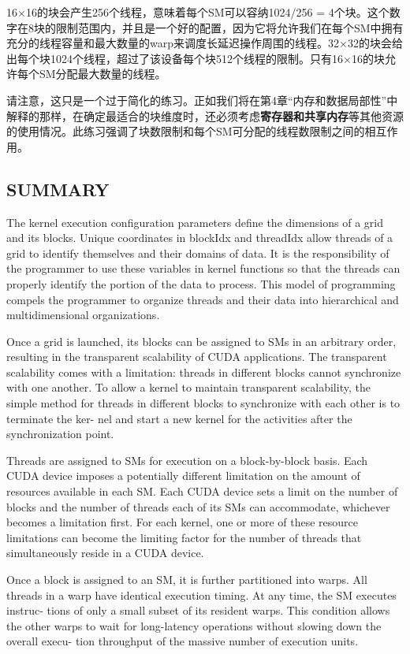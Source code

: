 \documentclass[11pt]{ctexart}
\begin{document}
16×16的块会产生256个线程，意味着每个SM可以容纳1024/256 = 4个块。这个数字在8块的限制范围内，并且是一个好的配置，因为它将允许我们在每个SM中拥有充分的线程容量和最大数量的warp来调度长延迟操作周围的线程。32×32的块会给出每个块1024个线程，超过了该设备每个块512个线程的限制。只有16×16的块允许每个SM分配最大数量的线程。

请注意，这只是一个过于简化的练习。正如我们将在第4章“内存和数据局部性”中解释的那样，在确定最适合的块维度时，还必须考虑\textbf{寄存器和共享内存}等其他资源的使用情况。此练习强调了块数限制和每个SM可分配的线程数限制之间的相互作用。

\subsection{SUMMARY}

The kernel execution configuration parameters define the dimensions of a grid and its blocks. Unique coordinates in blockIdx and threadIdx allow threads of a grid to identify themselves and their domains of data. It is the responsibility of the programmer to use these variables in kernel functions so that the threads can properly identify the portion of the data to process. This model of programming compels the programmer to organize threads and their data into hierarchical and multidimensional organizations.

Once a grid is launched, its blocks can be assigned to SMs in an arbitrary order, resulting in the transparent scalability of CUDA applications. The transparent scalability comes with a limitation: threads in different blocks cannot synchronize with
one another. To allow a kernel to maintain transparent scalability, the simple method
for threads in different blocks to synchronize with each other is to terminate the ker-
nel and start a new kernel for the activities after the synchronization point.

Threads are assigned to SMs for execution on a block-by-block basis. Each CUDA
device imposes a potentially different limitation on the amount of resources available
in each SM. Each CUDA device sets a limit on the number of blocks and the number
of threads each of its SMs can accommodate, whichever becomes a limitation first.
For each kernel, one or more of these resource limitations can become the limiting
factor for the number of threads that simultaneously reside in a CUDA device.

Once a block is assigned to an SM, it is further partitioned into warps. All threads
in a warp have identical execution timing. At any time, the SM executes instruc-
tions of only a small subset of its resident warps. This condition allows the other
warps to wait for long-latency operations without slowing down the overall execu-
tion throughput of the massive number of execution units.
\end{document}
